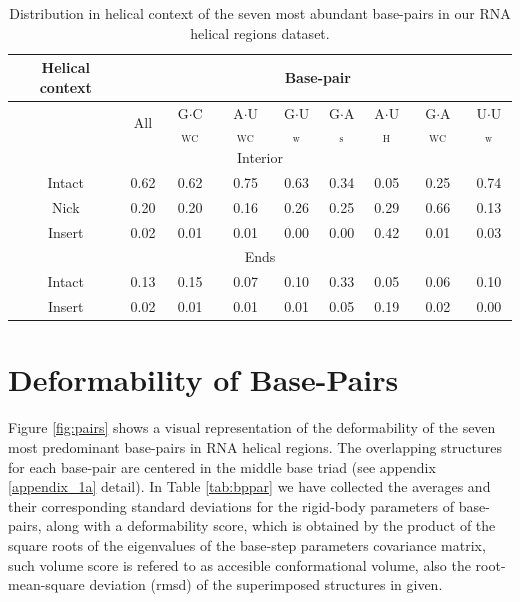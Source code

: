 \begin{table}[htbp]
\begin{center}
\begin{tabular}{|c|c|c|c|c|c|c|c|c|}
\hline
Helical context & \multicolumn{8}{c|}{Base-pair} \\
\hline
 & All & G$\cdot$C$_{\text{WC}}$ & A$\cdot$U$_{\text{WC}}$ &
G$\cdot$U$_{\text{w}}$ & G$\cdot$A$_{\text{s}}$ &
A$\cdot$U$_{\text{H}}$ & G$\cdot$A$_{\text{WC}}$ &
U$\cdot$U$_{\text{w}}$  \\
\hline
\multicolumn{9}{|c|}{Interior} \\
\hline
Intact &  0.62 & 0.62 & 0.75 & 0.63 & 0.34 & 0.05 & 0.25 & 0.74 \\
Nick   &  0.20 & 0.20 & 0.16 & 0.26 & 0.25 & 0.29 & 0.66 & 0.13 \\
Insert &  0.02 & 0.01 & 0.01 & 0.00 & 0.00 & 0.42 & 0.01 & 0.03 \\
\hline
\multicolumn{9}{|c|}{Ends} \\
\hline
Intact &  0.13 & 0.15 & 0.07 & 0.10 & 0.33 & 0.05 & 0.06 & 0.10 \\
Insert &  0.02 & 0.01 & 0.01 & 0.01 & 0.05 & 0.19 & 0.02 & 0.00 \\
\hline
\end{tabular}
\caption{Distribution in helical context of the seven most abundant
  base-pairs in our RNA helical regions dataset.}
\label{tab:helcontext}
\end{center}
\end{table}

\section{Deformability of Base-Pairs}
Figure   \ref{fig:pairs}  shows   a  visual   representation   of  the
deformability of the seven  most predominant base-pairs in RNA helical
regions. The overlapping structures for each base-pair are centered in
the  middle base  triad  (see appendix  \ref{appendix_1a} detail).  In
Table  \ref{tab:bppar}  we  have  collected  the  averages  and  their
corresponding  standard deviations  for the  rigid-body  parameters of
base-pairs, along with a
deformability score,  which is obtained  by the product of  the square
roots  of  the  eigenvalues  of the  base-step  parameters  covariance
matrix, such  volume score is  refered to as  accesible conformational
volume, also the root-mean-square deviation (rmsd) of the superimposed
structures in given.

